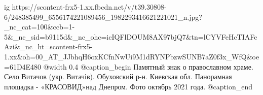  
 
 
 
 

\ifcmt
  ig https://scontent-frx5-1.xx.fbcdn.net/v/t39.30808-6/248385499_6556174221089456_1982293416621221021_n.jpg?_nc_cat=100&ccb=1-5&_nc_sid=b9115d&_nc_ohc=icIQFlDOUM8AX97bjQ7&tn=lCYVFeHcTIAFcAzi&_nc_ht=scontent-frx5-1.xx&oh=00_AT_JJbhqH6oxKCfnNwUi9M1dRYNPbzwSUNB7aZ0f3x_WfQ&oe=61D4E480
  @width 0.4
  @caption_begin
    Памятный знак о православном храме.
    Село Витачов (укр. Витачів). Обуховский р-н. Киевская обл. 
    Панорамная площадка - «КРАСОВИД»над Днепром. Фото октябрь 2021 года.
  @caption_end
\fi
